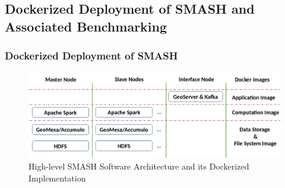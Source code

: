 \subsection{Dockerized Deployment of SMASH and Associated Benchmarking}
\begin{frame}
    \frametitle{Dockerized Deployment of SMASH}
    \begin{figure}
        \centering
        \includegraphics[width=\linewidth]{resource/figures/smash-docker.png}
        \caption{High-level SMASH Software Architecture and its Dockerized Implementation}
    \end{figure}
\end{frame}

